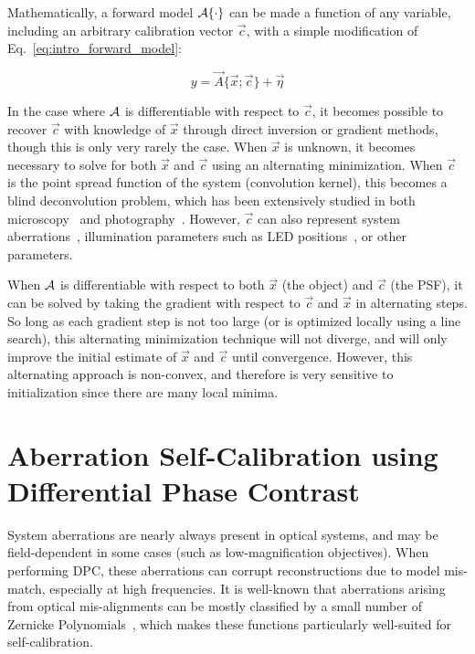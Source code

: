 Mathematically, a forward model $\mathcal{A}\{\cdot\}$ can be made a function of any variable, including an arbitrary calibration vector $\vec{c}$, with a simple modification of Eq.~\ref{eq:intro_forward_model}:

\begin{equation}\label{eq:self_calib_forward}
    y = \vec{A}\{\vec{x}; \vec{c}\} + \vec{\eta}
\end{equation}

In the case where $\mathcal{A}$ is differentiable with respect to $\vec{c}$, it becomes possible to recover $\vec{c}$ with knowledge of $\vec{x}$ through direct inversion or gradient methods, though this is only very rarely the case. When $\vec{x}$ is unknown, it becomes necessary to solve for both $\vec{x}$ and $\vec{c}$ using an alternating minimization. When $\vec{c}$ is the point spread function of the system (convolution kernel), this becomes a blind deconvolution problem, which has been extensively studied in both microscopy~\cite{Holmes1992blind, sarder2006deconvolution} and photography~\cite{ayers1988iterative, bell1995information, chan1998total, levin2006blind}. However, $\vec{c}$ can also represent system aberrations~\cite{Ou:14}, illumination parameters such as LED positions~\cite{Yeh2015}, or other parameters.

When $\mathcal{A}$ is differentiable with respect to both $\vec{x}$ (the object) and $\vec{c}$ (the PSF), it can be solved by taking the gradient with respect to $\vec{c}$ and $\vec{x}$ in alternating steps. So long as each gradient step is not too large (or is optimized locally using a line search), this alternating minimization technique will not diverge, and will only improve the initial estimate of $\vec{x}$ and $\vec{c}$ until convergence. However, this alternating approach is non-convex, and therefore is very sensitive to initialization since there are many local minima.

\section{Aberration Self-Calibration using Differential Phase Contrast}\label{sec:selfcal:dpc}

System aberrations are nearly always present in optical systems, and may be field-dependent in some cases (such as low-magnification objectives). When performing DPC, these aberrations can corrupt reconstructions due to model mis-match, especially at high frequencies. It is well-known that aberrations arising from optical mis-alignments can be mostly classified by a small number of Zernicke Polynomials~\cite{ZERNIKE1934689}, which makes these functions particularly well-suited for self-calibration.

